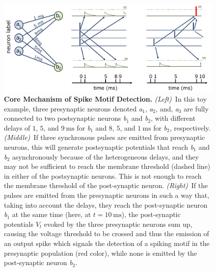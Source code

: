 \documentclass[runningheads]{llncs}
\newcommand{\ms}{\si{\milli\second}}%
\begin{document}
%
\begin{figure}[t]
  \centering
  \includegraphics[width=0.95\linewidth]{figures/izhikevich.pdf}%
    \caption{\textbf{Core Mechanism of Spike Motif Detection.} \textit{(Left)}~In this toy example, three presynaptic neurons denoted \textit{a}$_1$, \textit{a}$_2$, and, \textit{a}$_3$ are fully connected to two postsynaptic neurons \textit{b}$_1$ and \textit{b}$_2$, with different delays of $1$, $5$, and $9~\ms$ for \textit{b}$_1$ and $8$, $5$, and $1~\ms$ for \textit{b}$_2$, respectively. \textit{(Middle)}~If three synchronous pulses are emitted from presynaptic neurons, this will generate postsynaptic potentials that reach \textit{b}$_1$ and \textit{b}$_2$ asynchronously because of the heterogeneous delays, and they may not be sufficient to reach the membrane threshold (dashed line) in either of the postsynaptic neurons. This is not enough to reach the membrane threshold of the post-synaptic neuron.  \textit{(Right)}~If the pulses are emitted from the presynaptic neurons in such a way that, taking into account the delays, they reach the post-synaptic neuron \textit{b}$_1$ at the same time (here, at $t=10~\ms$), the post-synaptic potentials $V_t$ evoked by the three presynaptic neurons sum up, causing the voltage threshold to be crossed and thus the emission of an output spike which signals the detection of a spiking motif in the presynaptic population (red color), while none is emitted by the post-synaptic neuron \textit{b}$_2$.
     }
  \label{fig:izhikevich}
\end{figure}
\end{document}
